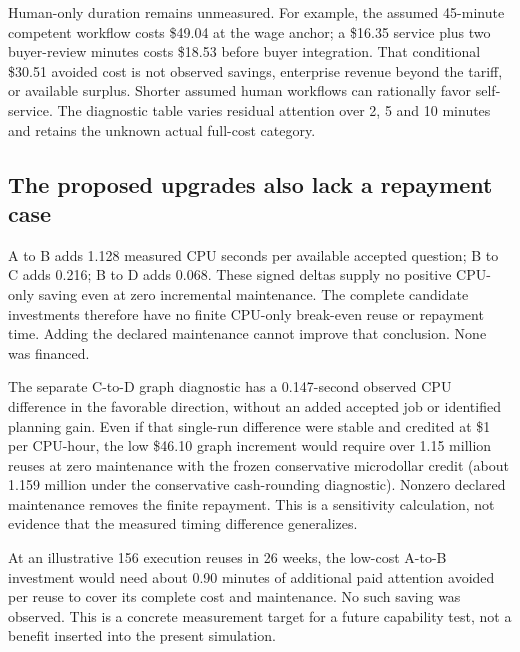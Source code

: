 Human-only duration remains unmeasured. For example, the assumed 45-minute competent workflow
costs \$49.04 at the wage anchor; a \$16.35 service plus two buyer-review minutes costs \$18.53
before buyer integration. That conditional \$30.51 avoided cost is not observed savings,
enterprise revenue beyond the tariff, or available surplus. Shorter assumed human workflows
can rationally favor self-service. The diagnostic table varies residual attention over 2, 5 and
10 minutes and retains the unknown actual full-cost category.

\subsection{The proposed upgrades also lack a repayment case}

A to B adds 1.128 measured CPU seconds per available accepted question; B to C adds 0.216;
B to D adds 0.068. These signed deltas supply no positive CPU-only saving even at zero incremental
maintenance. The complete candidate investments therefore have no finite CPU-only break-even
reuse or repayment time. Adding the declared maintenance cannot improve that conclusion.
None was financed.

The separate C-to-D graph diagnostic has a 0.147-second observed CPU difference in the favorable
direction, without an added accepted job or identified planning gain. Even if that single-run
difference were stable and credited at \$1 per CPU-hour, the low \$46.10 graph increment would
require over 1.15 million reuses at zero maintenance with the frozen conservative microdollar credit (about 1.159 million under the conservative
cash-rounding diagnostic). Nonzero declared maintenance removes the finite repayment.
This is a sensitivity calculation, not evidence that the measured timing difference generalizes.

At an illustrative 156 execution reuses in 26 weeks, the low-cost A-to-B investment would need
about 0.90 minutes of additional paid attention avoided per reuse to cover its complete cost
and maintenance. No such saving was observed. This is a concrete measurement target for a
future capability test, not a benefit inserted into the present simulation.
